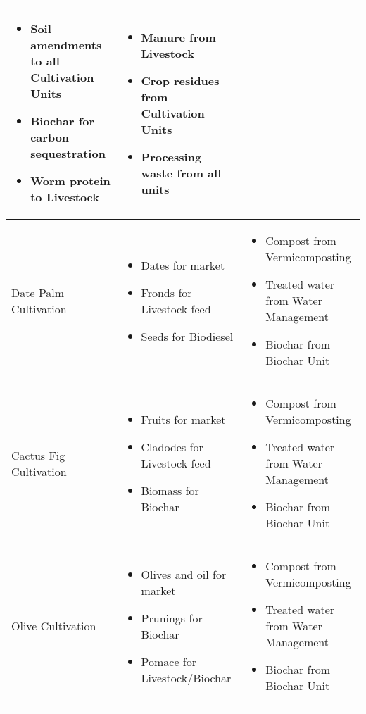 \begin{table}[h]
\begin{tabular}{|p{3cm}|p{5cm}|p{5cm}|}
\begin{itemize}
    \item Soil amendments to all Cultivation Units
    \item Biochar for carbon sequestration
    \item Worm protein to Livestock
\end{itemize} & 
\begin{itemize}
    \item Manure from Livestock
    \item Crop residues from Cultivation Units
    \item Processing waste from all units
\end{itemize} \\
\hline
Date Palm Cultivation & 
\begin{itemize}
    \item Dates for market
    \item Fronds for Livestock feed
    \item Seeds for Biodiesel
\end{itemize} & 
\begin{itemize}
    \item Compost from Vermicomposting
    \item Treated water from Water Management
    \item Biochar from Biochar Unit
\end{itemize} \\
\hline
Cactus Fig Cultivation & 
\begin{itemize}
    \item Fruits for market
    \item Cladodes for Livestock feed
    \item Biomass for Biochar
\end{itemize} & 
\begin{itemize}
    \item Compost from Vermicomposting
    \item Treated water from Water Management
    \item Biochar from Biochar Unit
\end{itemize} \\
\hline
Olive Cultivation & 
\begin{itemize}
    \item Olives and oil for market
    \item Prunings for Biochar
    \item Pomace for Livestock/Biochar
\end{itemize} & 
\begin{itemize}
    \item Compost from Vermicomposting
    \item Treated water from Water Management
    \item Biochar from Biochar Unit
\end{itemize} \\
\hline
\end{tabular}
\end{table}

